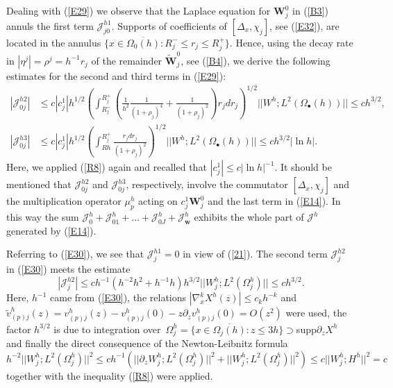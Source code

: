 \documentclass[11pt]{article}%
\numberwithin{equation}{section}
\begin{document}
Dealing with (\ref{E29}) we observe that the Laplace equation for
$\mathbf{W}_{j}^{0}$ in (\ref{B3}) annuls the first term $\mathcal{J}%
_{j0}^{h1}$. Supports of coefficients of $[\Delta_{x},\mathcal{\chi}_{j}]$,
see (\ref{E32}), are located in the annulus $\{x\in\overline{\Omega_{0}%
(h)}:R_{j}^{-}\leq r_{j}\leq R_{j}^{+}\}$. Hence, using the decay rate in
$|\eta^{j}|=\rho^{j}=h^{-1}r_{j}$ of the remainder $\widetilde{\mathbf{W}}%
_{j}^{0}$, see (\ref{B4}), we derive the following estimates for the second
and third terms in (\ref{E29}):%
\begin{align}
|\mathcal{J}_{0j}^{h2}|  &  \leq c|c_{j}^{1}|h^{1/2}\left(  \int_{R_{j}^{-}%
}^{R_{j}^{+}}\left(  \frac{1}{h^{2}}\frac{1}{(1+\rho_{j})^{4}}+\frac
{1}{(1+\rho_{j})^{2}}\right)  r_{j}dr_{j}\right)  ^{1/2}||W^{h};L^{2}%
(\Omega_{\bullet}(h))||\leq ch^{3/2},\label{E34}\\
|\mathcal{J}_{0j}^{h3}|  &  \leq c|c_{j}^{1}|h^{1/2}\left(  \int_{Rh}%
^{R_{j}^{+}}\frac{r_{j}dr_{j}}{(1+\rho_{j})^{2}}\right)  ^{1/2}||W^{h}%
;L^{2}(\Omega_{\bullet}(h))||\leq ch^{3/2}|\ln h|.\nonumber
\end{align}
Here, we applied (\ref{R8}) again and recalled that $|c_{j}^{1}|\leq c|\ln
h|^{-1}$. It should be mentioned that $\mathcal{J}_{0j}^{h2}$ and
$\mathcal{J}_{0j}^{h3}$, respectively, involve the commutator $[\Delta
_{x},\mathcal{\chi}_{j}]$ and the multiplication operator $\mu_{p}^{h}$ acting
on $c_{j}^{1}\mathbf{W}_{j}^{0}$ and the last term in (\ref{E14}). In this way
the sum $\mathcal{J}_{0}^{h}+\mathcal{J}_{01}^{h}+...+\mathcal{J}_{0J}%
^{h}+\mathcal{J}_{\mathbf{w}}^{h}$ exhibits the whole part of $\mathcal{J}%
^{h}$ generated by (\ref{E14}).

Referring to (\ref{E30}), we see that $\mathcal{J}_{j}^{h1}=0$ in view of
(\ref{21}). The second term $\mathcal{J}_{j}^{h2}$ in (\ref{E30}) meets the
estimate%
\[
|\mathcal{J}_{j}^{h2}|\leq ch^{-1}(h^{-2}h^{2}+h^{-1}h)h^{3/2}||W_{j}%
^{h};L^{2}(\Omega_{j}^{h})||\leq ch^{3/2}.
\]
Here, $h^{-1}$ came from (\ref{E30}), the relations $|\nabla_{x}^{k}%
X^{h}(z)|\leq c_{k}h^{-k}$ and $\widetilde{v}_{(p)j}^{h}(z)=v_{(p)j}%
^{h}(z)-v_{(p)j}^{h}(0)-z\partial_{z}v_{(p)j}^{h}(0)=O(z^{2})$ were used, the
factor $h^{3/2}$ is due to integration over\ $\Omega_{j}^{h}=\{x\in
\overline{\Omega_{j}(h)}:z\leq3h\}\supset$\textrm{supp}$\partial_{z}X^{h}$ and
finally the direct consequence of the Newton-Leibnitz formula%
\begin{equation}
h^{-2}||W_{j}^{h};L^{2}(\Omega_{j}^{h})||^{2}\leq ch^{-1}(||\partial_{z}%
W_{j}^{h};L^{2}(\Omega_{j}^{h})||^{2}+||W_{j}^{h};L^{2}(\Omega_{j}^{h}%
)||^{2})\leq c||W_{j}^{h};H^{h}||^{2}=c \label{NL}%
\end{equation}
together with the inequality (\ref{R8}) were applied.
\end{document}
